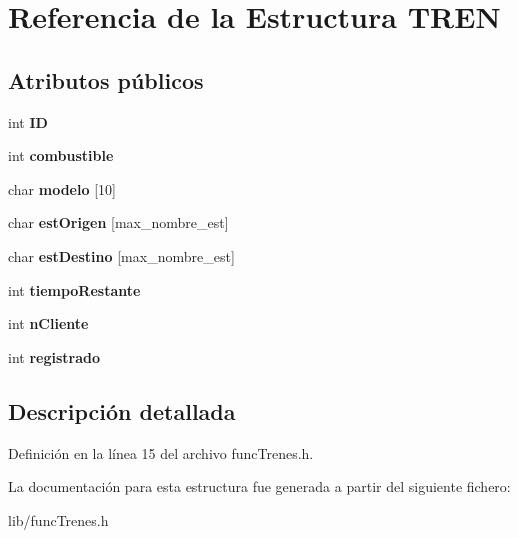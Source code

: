 \hypertarget{structTREN}{}\section{Referencia de la Estructura T\+R\+EN}
\label{structTREN}
\subsection*{Atributos públicos}
\begin{DoxyCompactItemize}
\item 
\mbox{\label{structTREN_a43cea43e84e3275eb1a0a2e8605562e5}} 
int {\bfseries ID}
\item 
\mbox{\label{structTREN_a524f3fda8e110d095498c06970d9d152}} 
int {\bfseries combustible}
\item 
\mbox{\label{structTREN_af25bb44a4e53f11bf29f10ba75ab7165}} 
char {\bfseries modelo} \mbox{[}10\mbox{]}
\item 
\mbox{\label{structTREN_a80fca1e3e843ddc9be1e20dc23da6e9f}} 
char {\bfseries est\+Origen} \mbox{[}max\+\_\+nombre\+\_\+est\mbox{]}
\item 
\mbox{\label{structTREN_a7b2410dcd75343e2d8ce70bf2c9e5162}} 
char {\bfseries est\+Destino} \mbox{[}max\+\_\+nombre\+\_\+est\mbox{]}
\item 
\mbox{\label{structTREN_aa340a154137e45caaa9b48cf59c625db}} 
int {\bfseries tiempo\+Restante}
\item 
\mbox{\label{structTREN_ad9af56dd606a6c0f1f05f10bc9f13751}} 
int {\bfseries n\+Cliente}
\item 
\mbox{\label{structTREN_a53b1e9f8b37523bac738a9e545d1c843}} 
int {\bfseries registrado}
\end{DoxyCompactItemize}


\subsection{Descripción detallada}


Definición en la línea 15 del archivo func\+Trenes.\+h.



La documentación para esta estructura fue generada a partir del siguiente fichero\+:\begin{DoxyCompactItemize}
\item 
lib/func\+Trenes.\+h\end{DoxyCompactItemize}
